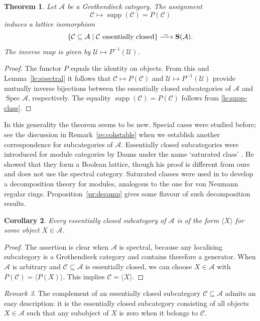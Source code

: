 \documentclass[a4paper]{amsart}
\theoremstyle{plain}
\newtheorem{thm}{Theorem}[section]
\newtheorem{cor}[thm]{Corollary}
\theoremstyle{definition}
\theoremstyle{remark}
\newtheorem{rem}[thm]{Remark}
\numberwithin{equation}{section}
\newcommand{\Spec}{\operatorname{Spec}}
\newcommand{\supp}{\operatorname{supp}}
\newcommand{\longiso}{\xrightarrow{\ \raisebox{-.4ex}[0ex][0ex]{$\scriptstyle{\sim}$}\ }}
\def\A{\mathcal A}
\def\C{\mathcal C}
\def\U{\mathcal U}
\def\bfS{\mathbf S}
\begin{document}
\begin{thm}\label{th:spectral}
  Let $\A$ be a Grothendieck category. The assignment
  \[\C\longmapsto\supp(\C)=P(\C)\] induces a lattice isomorphism
\[\{\C\subseteq\A\mid \C\text{ essentially closed}\}\longiso\bfS(\A).\]
The inverse map is given by  $\U\mapsto P^{-1}(\U)$.
\end{thm}

\begin{proof}
  The functor $P$ equals the identity on objects. From this and
  Lemma~\ref{le:spectral} it follows that $\C\mapsto P(\C)$ and
  $\U\mapsto P^{-1}(\U)$ provide mutually inverse bijections between
  the essentially closed subcategories of $\A$ and $\Spec\A$, respectively. The
  equality $\supp(\C)=P(\C)$ follows from \eqref{le:supp-class}.
\end{proof}


In this generality the theorem seems to be new.  Special cases were
studied before; see the discussion in Remark~\ref{re:cohstable} when
we establish another correspondence for subcategories of $\A$.
Essentially closed subcategories were introduced for module categories by Dauns
under the name `saturated class' \cite{Da1997}. He showed that they
form a Boolean lattice, though his proof is different from ours and
does not use the spectral category. Saturated classes were used in
\cite{Da1997} to develop a decomposition theory for modules, analogous
to the one for von Neumann regular rings. Proposition~\ref{pr:decomp}
gives some flavour of such decomposition results.

\begin{cor}\label{co:gen}
Every essentially closed subcategory of $\A$ is of the form $\langle X\rangle$
for some object $X\in\A$.
\end{cor}
\begin{proof}
  The assertion is clear when $\A$ is spectral, because any localising
  subcategory is a Grothendieck category and contains therefore a
  generator. When $\A$ is arbitrary and $\C\subseteq\A$ is essentially closed,
  we can choose $X\in\A$ with $P(\C)=\langle P(X)\rangle$. This implies $\C=\langle X\rangle$.
\end{proof}

\begin{rem}
  The complement of an essentially closed subcategory $\C\subseteq\A$ admits an
  easy description: it is the essentially closed subcategory consisting of all
  objects  $X\in\A$ such that any subobject of $X$ is zero when it
  belongs to $\C$.
\end{rem}
\end{document}
